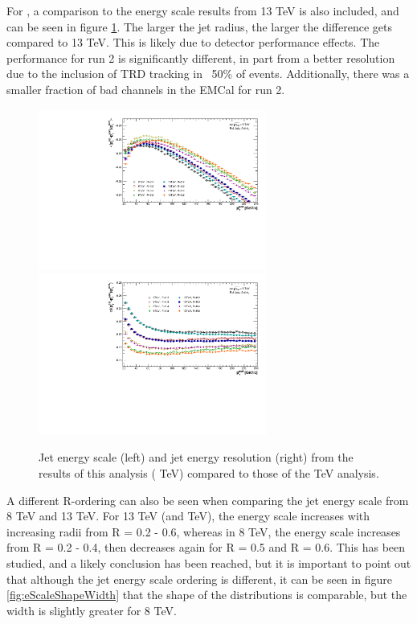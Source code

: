 For \pp, a comparison to the energy scale results from 13 TeV is also included, and can be seen in figure \ref{fig:EnergyScaleComp}. The larger the jet radius, the larger the difference gets compared to 13 TeV. This is likely due to detector performance effects. The performance for run 2 is significantly different, in part from a better resolution due to the inclusion of TRD tracking in ~50\% of events. Additionally, there was a smaller fraction of bad channels in the EMCal for run 2.

\begin{figure}[h!]
    \centering
    \begin{multicols}{2}
            \includegraphics[width=7.5cm]{figures/EnergyScale/EnergyScaleMean_Comparison.pdf}
        \vfill\null 
        \columnbreak
            \includegraphics[width=7.5cm]{figures/EnergyScale/EnergyScaleWidth_Comparison.pdf}
        \vfill\null
    \end{multicols}
    \caption{Jet energy scale (left) and jet energy resolution (right) from the results of this analysis ( TeV) compared to those of the  TeV analysis.}
    \label{fig:EnergyScaleComp}
\end{figure}

A different R-ordering can also be seen when comparing the jet energy scale from 8 TeV and 13 TeV. For 13 TeV (and  TeV), the energy scale increases with increasing radii from R = 0.2 - 0.6, whereas in 8 TeV, the energy scale increases from R = 0.2 - 0.4, then decreases again for R = 0.5 and R = 0.6. This has been studied, and a likely conclusion has been reached, but it is important to point out that although the jet energy scale ordering is different, it can be seen in figure \ref{fig:eScaleShapeWidth} that the shape of the distributions is comparable, but the width is slightly greater for 8 TeV.

